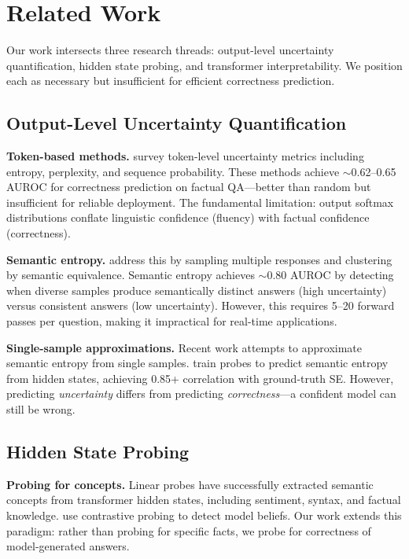 \section{Related Work}

Our work intersects three research threads: output-level uncertainty quantification, hidden state probing, and transformer interpretability. We position each as necessary but insufficient for efficient correctness prediction.

\subsection{Output-Level Uncertainty Quantification}

\textbf{Token-based methods.} \citet{fadeeva2024survey} survey token-level uncertainty metrics including entropy, perplexity, and sequence probability. These methods achieve $\sim$0.62--0.65 AUROC for correctness prediction on factual QA---better than random but insufficient for reliable deployment. The fundamental limitation: output softmax distributions conflate linguistic confidence (fluency) with factual confidence (correctness).

\textbf{Semantic entropy.} \citet{kuhn2023semantic} address this by sampling multiple responses and clustering by semantic equivalence. Semantic entropy achieves $\sim$0.80 AUROC by detecting when diverse samples produce semantically distinct answers (high uncertainty) versus consistent answers (low uncertainty). However, this requires 5--20 forward passes per question, making it impractical for real-time applications.

\textbf{Single-sample approximations.} Recent work attempts to approximate semantic entropy from single samples. \citet{kossen2024semantic} train probes to predict semantic entropy from hidden states, achieving 0.85+ correlation with ground-truth SE. However, predicting \emph{uncertainty} differs from predicting \emph{correctness}---a confident model can still be wrong.

\subsection{Hidden State Probing}

\textbf{Probing for concepts.} Linear probes have successfully extracted semantic concepts from transformer hidden states, including sentiment, syntax, and factual knowledge. \citet{burns2023discovering} use contrastive probing to detect model beliefs. Our work extends this paradigm: rather than probing for specific facts, we probe for correctness of model-generated answers.

